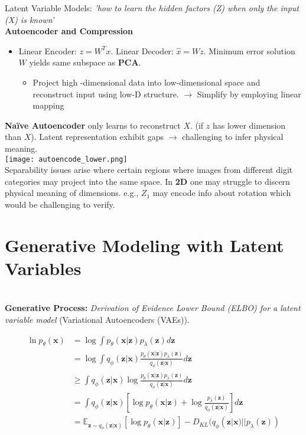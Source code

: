 \documentclass[twocolumn]{article}
\begin{document}
\begin{literaturepaper}{Latent Variable Models:}
    \textit{'how to learn the hidden factors (Z) when only the input (X) is known'}\\

    \textbf{Autoencoder and Compression}

    \begin{itemize}
        \item Linear Encoder: $z = W^Tx$. Linear Decoder: $\hat{x} = Wz$. Minimum error solution $W$ yields same subspace as \textbf{PCA}.
        \begin{itemize}
            \item Project high -dimensional data into low-dimensional space and reconstruct input using low-D structure. $\rightarrow$ Simplify by employing linear mapping
        \end{itemize}
    \end{itemize}

\textbf{Naïve Autoencoder} only learns to reconstruct $X$. (if $z$ has lower dimension than $X$). Latent representation exhibit gaps $\rightarrow$ challenging to infer physical meaning. \\

\texttt{[image: autoencode\_lower.png]}\\

Separability issues arise where certain regions where images from different digit categories may project into the same space. In \textbf{2D} one may struggle to discern physical meaning of dimensions. e.g., $Z_1$ may encode info about rotation which would be challenging to verify.

\section{Generative Modeling with Latent Variables}\\

\textbf{Generative Process:} \textit{Derivation of Evidence Lower Bound (ELBO) for a latent variable model} (Variational Autoencoders (VAEs)).

\begin{align*}
\ln p_{\theta}(\mathbf{x}) &= \log \int p_{\theta}(\mathbf{x}|\mathbf{z})p_{\lambda}(\mathbf{z})d\mathbf{z} \\
&= \log \int q_{\phi}(\mathbf{z}|\mathbf{x}) \frac{p_{\theta}(\mathbf{x}|\mathbf{z})p_{\lambda}(\mathbf{z})}{q_{\phi}(\mathbf{z}|\mathbf{x})} d\mathbf{z} \\
&\ge \int q_{\phi}(\mathbf{z}|\mathbf{x}) \log \frac{p_{\theta}(\mathbf{x}|\mathbf{z})p_{\lambda}(\mathbf{z})}{q_{\phi}(\mathbf{z}|\mathbf{x})} d\mathbf{z} \quad \\
&= \int q_{\phi}(\mathbf{z}|\mathbf{x}) \left[ \log p_{\theta}(\mathbf{x}|\mathbf{z}) + \log \frac{p_{\lambda}(\mathbf{z})}{q_{\phi}(\mathbf{z}|\mathbf{x})} \right] d\mathbf{z} \\
&= \mathbb{E}_{\mathbf{z} \sim q_{\phi}(\mathbf{z}|\mathbf{x})} [\log p_{\theta}(\mathbf{x}|\mathbf{z})] - D_{KL}(q_{\phi}(\mathbf{z}|\mathbf{x}) || p_{\lambda}(\mathbf{z}))
\end{align*}


\end{literaturepaper}
\end{document}
